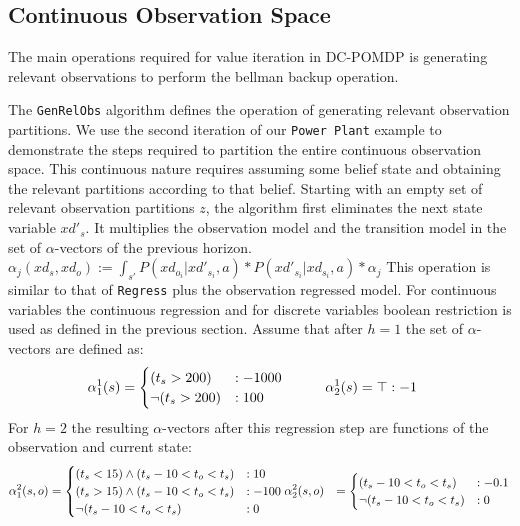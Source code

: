 \documentclass{article} %
\begin{document}
\subsection{Continuous Observation Space} 
The main operations required for value iteration in DC-POMDP is generating relevant observations to perform the bellman backup operation. 

The \texttt{GenRelObs} algorithm defines the operation of generating relevant observation partitions. 
We use the second iteration of our \texttt{Power Plant} example to demonstrate the steps  required to partition the entire continuous observation space. This continuous nature requires assuming some belief state and obtaining the relevant partitions according to that belief. 
Starting with an empty set of relevant observation partitions $z$, the algorithm first eliminates the next state variable $xd'_s$. It multiplies the observation model and the transition model in the set of $\alpha$-vectors of the previous horizon.
$\alpha_j(xd_s,xd_o) := \int_{s'} P(xd_{o_i}|xd'_{s_i},a) * P(xd'_{s_i}| xd_{s_i},a)* \alpha_j $
This operation is similar to that of \texttt{Regress} plus the observation regressed model. For continuous variables the continuous regression and for discrete variables boolean restriction is used as defined in the previous section. 
Assume that after $h=1$ the set of $\alpha$-vectors are defined as:
\begin{align}
\alpha_1^1(s) &= 
\begin{cases}
 (t_s>200) &: -1000 \\
\neg(t_s>200) &: 100 \\
\end{cases}
\hspace{10mm} 
\alpha_2^1(s) = \top: -1 \nonumber
\end{align}
For $h=2$ the resulting $\alpha$-vectors after this regression step are functions of the observation and current state: 
\begin{align}
\alpha_1^2(s,o) &= 
\begin{cases}
 (t_s<15)\wedge (t_s - 10 < t_o<t_s) &: 10 \\
(t_s>15)\wedge (t_s - 10 < t_o<t_s) &: -100  \\
\neg(t_s - 10 < t_o<t_s) &: 0
\end{cases}
\hspace{0mm} 
\alpha_2^2(s,o) &= \begin{cases}
(t_s - 10 < t_o<t_s) &: -0.1 \\
\neg(t_s - 10 < t_o<t_s) &: 0
\end{cases}
\nonumber
\end{align}
\end{document}
